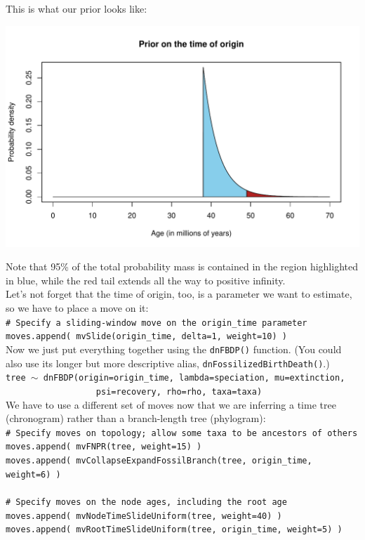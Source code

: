 \documentclass[12pt]{article}
\begin{document}
\noindent This is what our prior looks like:

\includegraphics[width=\textwidth]{timeoforiginprior.pdf}

\noindent Note that 95\% of the total probability mass is contained in the region highlighted in blue, while the red tail extends all the way to positive infinity. \\

\noindent Let's not forget that the time of origin, too, is a parameter we want to estimate, so we have to place a move on it: \\

\indent \texttt{\# Specify a sliding-window move on the origin\_time parameter} \\
\indent \texttt{moves.append( mvSlide(origin\_time, delta=1, weight=10) )} \\

\noindent Now we just put everything together using the \texttt{dnFBDP()} function. (You could also use its longer but more descriptive alias, \texttt{dnFossilizedBirthDeath()}.) \\

\indent \texttt{tree {\footnotesize $\sim$} dnFBDP(origin=origin\_time, lambda=speciation, mu=extinction,} \\
\indent \texttt{\ \ \ \,\ \ \ \ \ \ \ \ \ \ \ \ \ \ psi=recovery, rho=rho, taxa=taxa)} \\

\noindent We have to use a different set of moves now that we are inferring a time tree (chronogram) rather than a branch-length tree (phylogram): \\

\indent \texttt{\# Specify moves on topology; allow some taxa to be ancestors of others} \\
\indent \texttt{moves.append( mvFNPR(tree, weight=15) )} \\
\indent \texttt{moves.append( mvCollapseExpandFossilBranch(tree, origin\_time, weight=6) )} \\
\ \\
\indent \texttt{\# Specify moves on the node ages, including the root age} \\
\indent \texttt{moves.append( mvNodeTimeSlideUniform(tree, weight=40) )} \\
\indent \texttt{moves.append( mvRootTimeSlideUniform(tree, origin\_time, weight=5) )} \\
\end{document}
